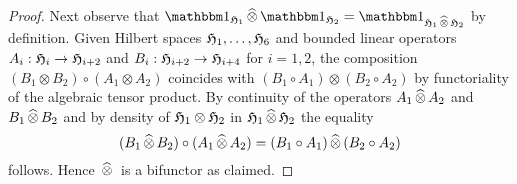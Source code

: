 \begin{proof}
  Next observe that
  $\idn_{ \hilbertH_1} \cplttensor \idn_{\hilbertH_2} = \idn_{\hilbertH_1 \cplttensor \hilbertH_2}$
  by definition.  Given Hilbert spaces $\mathfrak{H}_1,\ldots,\mathfrak{H}_6$
  and bounded linear operators $A_i: \mathfrak{H}_{i}\to \mathfrak{H}_{i+2}$ and
  $B_i : \mathfrak{H}_{i+2}\to \mathfrak{H}_{i+4}$ for $i=1,2$, the composition 
  $(B_1 \otimes B_2 ) \circ (A_1 \otimes A_2)$ coincides with
  $ (B_1\circ A_1) \otimes (B_2\circ A_2) $ by functoriality of the algebraic tensor product. 
  By continuity of the operators $A_1 {\,\widehat{\otimes}\,} A_2$ and $B_1 {\,\widehat{\otimes}\,} B_2$ and
  by density of $\mathfrak{H}_1\otimes \mathfrak{H}_2$ in $\mathfrak{H}_1{\,\widehat{\otimes}\,} \mathfrak{H}_2$
  the equality 
  \[
    (B_1 {\,\widehat{\otimes}\,} B_2 ) \circ (A_1 {\,\widehat{\otimes}\,} A_2) =
    (B_1\circ A_1) {\,\widehat{\otimes}\,} (B_2\circ A_2)
  \]
  follows. Hence ${\,\widehat{\otimes}\,}$ is a bifunctor as claimed. 
\end{proof}


